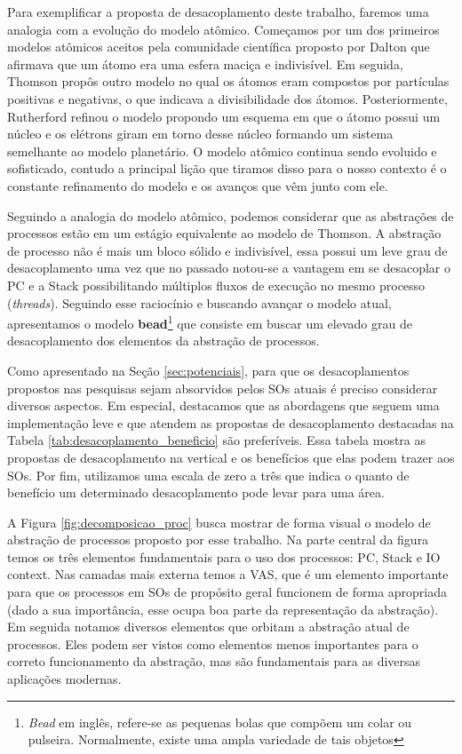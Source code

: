 Para exemplificar a proposta de desacoplamento deste trabalho, faremos uma
analogia com a evolução do modelo atômico. Começamos por um dos primeiros
modelos atômicos aceitos pela comunidade científica proposto por Dalton que
afirmava que um átomo era uma esfera maciça e indivisível. Em seguida, Thomson
propôs outro modelo no qual os átomos eram compostos por partículas positivas e
negativas, o que indicava a divisibilidade dos átomos. Posteriormente, Rutherford
refinou o modelo propondo um esquema em que o átomo possui um núcleo e os
elétrons giram em torno desse núcleo formando um sistema semelhante ao modelo
planetário. O modelo atômico continua sendo evoluido e sofisticado, contudo a principal lição que tiramos disso para o nosso contexto é o
constante refinamento do modelo e os avanços que vêm junto com ele.

Seguindo a analogia do modelo atômico, podemos considerar que as abstrações de
processos estão em um estágio equivalente ao modelo de Thomson. A abstração de
processo não é mais um bloco sólido e indivisível, essa possui um leve grau de
desacoplamento uma vez que no passado notou-se a vantagem em se desacoplar o PC
e a Stack possibilitando múltiplos fluxos de execução no mesmo processo
(\emph{threads}). Seguindo esse raciocínio e buscando avançar o modelo atual,
apresentamos o modelo \textbf{bead}\footnote{\emph{Bead} em inglês,
refere-se as pequenas bolas que compõem um colar ou pulseira. Normalmente,
existe uma ampla variedade de tais objetos} que consiste em buscar um elevado
grau de desacoplamento dos elementos da abstração de processos.

Como apresentado na Seção \ref{sec:potenciais}, para que os desacoplamentos
propostos nas pesquisas sejam absorvidos pelos SOs atuais é preciso considerar
diversos aspectos. Em especial, destacamos que as abordagens que seguem uma
implementação leve e que atendem as propostas de desacoplamento destacadas na
Tabela \ref{tab:desacoplamento_beneficio} são preferíveis. Essa tabela mostra as
propostas de desacoplamento na vertical e os benefícios que elas podem trazer
aos SOs. Por fim, utilizamos uma escala de zero a três  que indica o
quanto de benefício um determinado desacoplamento pode levar para uma área.



A Figura \ref{fig:decomposicao_proc} busca mostrar de forma visual o modelo de
abstração de processos proposto por esse trabalho. Na parte central da figura
temos os três elementos fundamentais para o uso dos processos: PC, Stack e IO
context. Nas camadas mais externa temos a VAS, que é um elemento importante
para que os processos em SOs de propósito geral funcionem de forma apropriada
(dado a sua importância, esse ocupa boa parte da representação da abstração).
Em seguida notamos diversos elementos que orbitam a abstração atual de
processos. Eles podem ser vistos como elementos menos importantes para o
correto funcionamento da abstração, mas são fundamentais para as diversas
aplicações modernas.

